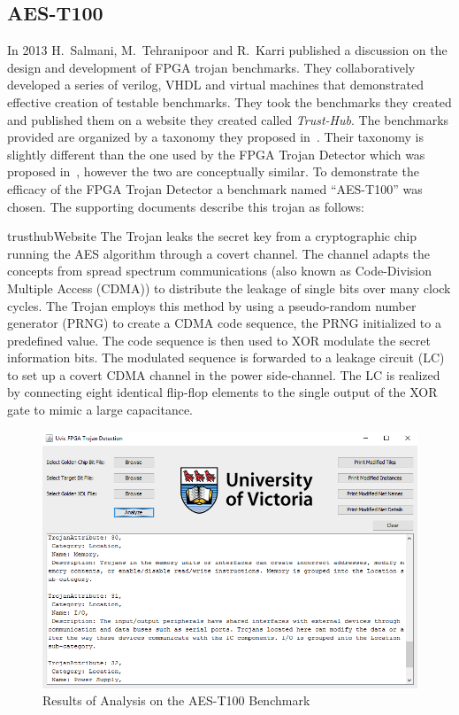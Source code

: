 \documentclass[journal, hidelinks]{IEEEtran}
\begin{document}
\subsection{AES-T100} \label{sec:aesT100}
In 2013 H.~Salmani, M.~Tehranipoor and R.~Karri published a discussion on the design and development of FPGA trojan benchmarks.
They collaboratively developed a series of verilog, VHDL and virtual machines that demonstrated effective creation of testable benchmarks.
They took the benchmarks they created and published them on a website they created called \textit{Trust-Hub}.
The benchmarks provided are organized by a taxonomy they proposed in~\cite{trustHubPaper}.
Their taxonomy is slightly different than the one used by the FPGA Trojan Detector which was proposed in~\cite{samerAttribute}, however the two are conceptually similar.
To demonstrate the efficacy of the FPGA Trojan Detector a benchmark named ``AES-T100'' was chosen. 
The supporting documents describe this trojan as follows:
\begin{displaycquote}{trusthubWebsite}
	The Trojan leaks the secret key from a cryptographic chip running the AES algorithm through a covert channel. The channel adapts the concepts from spread spectrum communications (also known as Code-Division Multiple Access (CDMA)) to distribute the leakage of single bits over many clock cycles. The Trojan employs this method by using a pseudo-random number generator (PRNG) to create a CDMA code sequence, the PRNG initialized to a predefined value. The code sequence is then used to XOR modulate the secret information bits. The modulated sequence is forwarded to a leakage circuit (LC) to set up a covert CDMA channel in the power side-channel. The LC is realized by connecting eight identical flip-flop elements to the single output of the XOR gate to mimic a large capacitance.
\end{displaycquote}
\begin{figure}[t]
	\centering
	\includegraphics[width=0.7\linewidth]{Figures/aesResult}
	\caption[Results of Analysis on the AES-T100 Benchmark]{Results of Analysis on the AES-T100 Benchmark}
	\label{fig:aesResult}
\end{figure}
\end{document}
